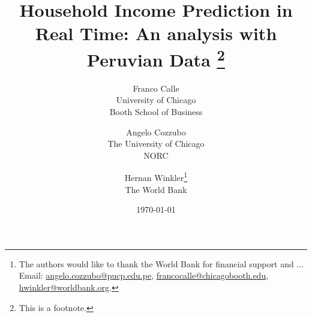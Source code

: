 \title{Household Income Prediction in Real Time: An analysis with Peruvian Data \footnote{This is a footnote.}}
\date{\today}
\author{
  Franco Calle \\
  \normalsize{University of Chicago}\\ 
  \normalsize{Booth School of Business}
  \and
  Angelo Cozzubo \\
  \normalsize{The University of Chicago}\\
  \normalsize{NORC}
  \and
  Hernan Winkler\thanks{The authors would like to thank the World Bank for financial support and ... \\ Email: \href{mailto:francocalle@chicagobooth.edu}{angelo.cozzubo@pucp.edu.pe},
  \href{mailto:angelo.cozzubo@pucp.edu.pe}{francocalle@chicagobooth.edu}, 
  \href{mailto:hwinkler@worldbank.org}{hwinkler@worldbank.org}.} \\
  \normalsize{The World Bank}
}
